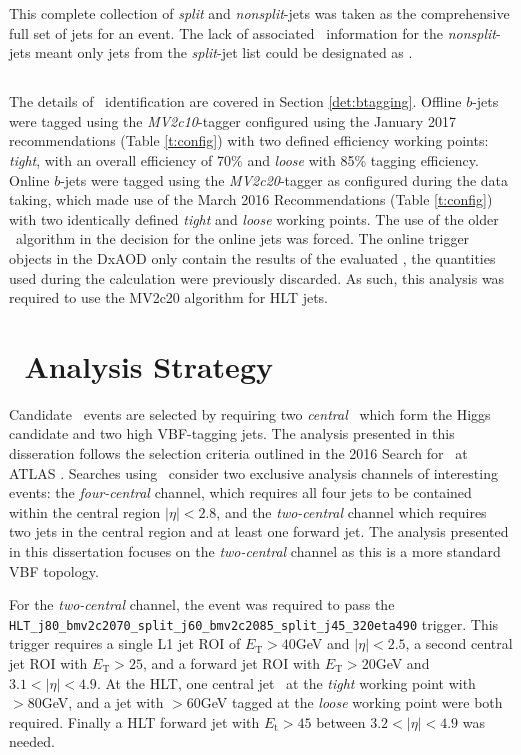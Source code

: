 		This complete collection of \textit{split} and \textit{nonsplit}-jets was taken as the comprehensive full set of jets for an event. The lack of associated \btag\ information for the \textit{nonsplit}-jets meant only jets from the \textit{split}-jet list could be designated as \bjets.

		\subsection{\bjets}

		The details of \bjet\ identification are covered in Section \ref{det:btagging}. Offline $b$-jets were tagged using the \textit{MV2c10}-tagger configured using the January 2017 recommendations (Table \ref{t:config}) with two defined efficiency working points: \textit{tight}, with an overall efficiency of 70\% and \textit{loose} with 85\% tagging efficiency. Online $b$-jets were tagged using the \textit{MV2c20}-tagger as configured during the data taking, which made use of the March 2016 Recommendations (Table \ref{t:config}) with two identically defined \textit{tight} and \textit{loose} working points. The use of the older \btagging\ algorithm in the decision for the online jets was forced. The online trigger objects in the DxAOD only contain the results of the evaluated \btag, the quantities used during the calculation were previously discarded. As such, this analysis was required to use the MV2c20 algorithm for HLT jets.


	\section{\VBFHBB\, Analysis Strategy}


	\label{es:as}
		Candidate \VBFHBB\, events are selected by requiring two \textit{central} \bjets\, which form the Higgs candidate and two high \pt VBF-tagging jets. The analysis presented in this disseration follows the selection criteria outlined in the 2016 Search for \VBFHBB\ at ATLAS \cite{VBFHbb8tev}. Searches using \VBFHBB\, consider two exclusive analysis channels of interesting events: the \textit{four-central} channel, which requires all four jets to be contained within the central region $|\eta| < 2.8$, and the \textit{two-central} channel which requires two jets in the central region and at least one forward jet.
		The analysis presented in this dissertation focuses on the \textit{two-central} channel as this is a more standard VBF topology.

		For the \textit{two-central} channel, the event was required to pass the \texttt{HLT\_j80\_bmv2c2070\_split\_\-j60\_bmv2c2085\_split\_j45\_320eta490} trigger. This trigger requires a single L1 jet ROI of $E_\text{T} > 40$GeV and $|\eta| < 2.5$, a second central jet ROI with $E_\text{T} > 25$, and a forward jet ROI with $E_\text{T} > 20$GeV and $3.1 < |\eta| < 4.9$.
		At the HLT, one central jet \btagged\, at the \textit{tight} working point with \pt $>80$GeV, and a jet with \pt$>60$GeV tagged at the \textit{loose} working point were both required. Finally a HLT forward jet with $E_\text{t}>45$ between $3.2 < |\eta| < 4.9$ was needed.

